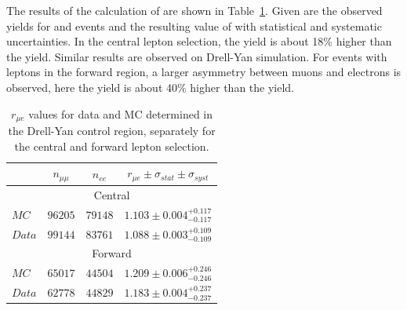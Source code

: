 The results of the calculation of \rmue are shown in Table~\ref{tab:RValuesControl}. Given are the observed yields for \MM and \EE events and the resulting value of \rmue with statistical and systematic uncertainties. In the central lepton selection, the \MM yield is about 18\% higher than the \EE yield. Similar results are observed on Drell-Yan simulation. For events with leptons in the forward region, a larger asymmetry between muons and electrons is observed, here the \MM yield is about 40\% higher than the \EE yield. 
\begin{table}[hbp]  \centering \renewcommand{\arraystretch}{1.2} \begin{tabular}{l|c|c|c}     
     & $n_{\mu\mu}$ & $n_{ee}$ & $r_{\mu e} \pm \sigma_{stat} \pm \sigma_{syst}$    \\    \hline
\multicolumn{4}{c}{Central} \\ \hline
    $MC$ & $              96205$ & $              79148$ & $              1.103\pm               0.004^{+              0.117}_{-              0.117}$    \\ 
    $Data$ & $              99144$ & $              83761$ & $              1.088\pm               0.003^{+              0.109}_{-              0.109}$    \\    \hline   
\multicolumn{4}{c}{Forward} \\ \hline    
    $MC$ & $              65017$ & $              44504$ & $              1.209\pm               0.006^{+              0.246}_{-              0.246}$    \\ 
    $Data$ & $              62778$ & $              44829$ & $              1.183\pm               0.004^{+              0.237}_{-              0.237}$    \\    \hline     
\end{tabular}  
\caption{$r_{\mu e}$ values for data and MC determined in the Drell-Yan control region, separately for the central and forward lepton selection.} 
\label{tab:RValuesControl}
\end{table}
